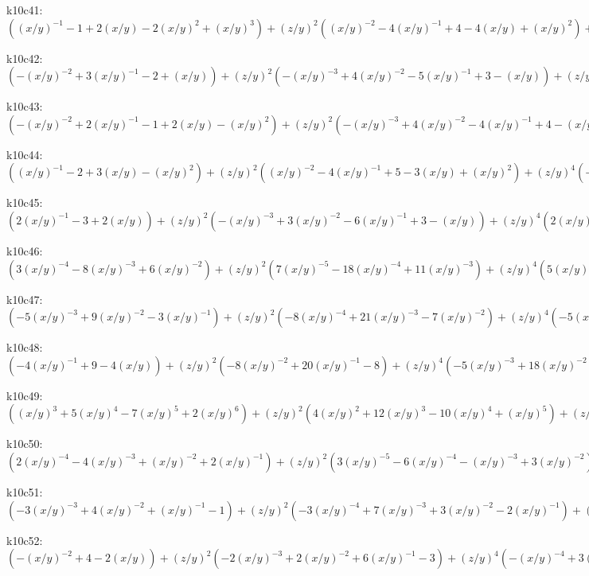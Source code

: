 k10c41: $ ((x/y)^{-1}-1+2(x/y)-2(x/y)^{2}+(x/y)^{3})  +(z/y)^{2}((x/y)^{-2}-4(x/y)^{-1}+4-4(x/y)+(x/y)^{2})  +(z/y)^{4}(-2(x/y)^{-2}+3(x/y)^{-1}-2)  +(x/y)^{-2}(z/y)^{6} $ 

k10c42: $ (-(x/y)^{-2}+3(x/y)^{-1}-2+(x/y))  +(z/y)^{2}(-(x/y)^{-3}+4(x/y)^{-2}-5(x/y)^{-1}+3-(x/y))  +(z/y)^{4}(2(x/y)^{-3}-3(x/y)^{-2}+2(x/y)^{-1})  -(x/y)^{-3}(z/y)^{6} $ 

k10c43: $ (-(x/y)^{-2}+2(x/y)^{-1}-1+2(x/y)-(x/y)^{2})  +(z/y)^{2}(-(x/y)^{-3}+4(x/y)^{-2}-4(x/y)^{-1}+4-(x/y))  +(z/y)^{4}(2(x/y)^{-3}-3(x/y)^{-2}+2(x/y)^{-1})  -(x/y)^{-3}(z/y)^{6} $ 

k10c44: $ ((x/y)^{-1}-2+3(x/y)-(x/y)^{2})  +(z/y)^{2}((x/y)^{-2}-4(x/y)^{-1}+5-3(x/y)+(x/y)^{2})  +(z/y)^{4}(-2(x/y)^{-2}+3(x/y)^{-1}-2)  +(x/y)^{-2}(z/y)^{6} $ 

k10c45: $ (2(x/y)^{-1}-3+2(x/y))  +(z/y)^{2}(-(x/y)^{-3}+3(x/y)^{-2}-6(x/y)^{-1}+3-(x/y))  +(z/y)^{4}(2(x/y)^{-3}-3(x/y)^{-2}+2(x/y)^{-1})  -(x/y)^{-3}(z/y)^{6} $ 

k10c46: $ (3(x/y)^{-4}-8(x/y)^{-3}+6(x/y)^{-2})  +(z/y)^{2}(7(x/y)^{-5}-18(x/y)^{-4}+11(x/y)^{-3})  +(z/y)^{4}(5(x/y)^{-6}-17(x/y)^{-5}+6(x/y)^{-4})  +(z/y)^{6}((x/y)^{-7}-7(x/y)^{-6}+(x/y)^{-5})  -(x/y)^{-7}(z/y)^{8} $ 

k10c47: $ (-5(x/y)^{-3}+9(x/y)^{-2}-3(x/y)^{-1})  +(z/y)^{2}(-8(x/y)^{-4}+21(x/y)^{-3}-7(x/y)^{-2})  +(z/y)^{4}(-5(x/y)^{-5}+18(x/y)^{-4}-5(x/y)^{-3})  +(z/y)^{6}(-(x/y)^{-6}+7(x/y)^{-5}-(x/y)^{-4})  +(x/y)^{-6}(z/y)^{8} $ 

k10c48: $ (-4(x/y)^{-1}+9-4(x/y))  +(z/y)^{2}(-8(x/y)^{-2}+20(x/y)^{-1}-8)  +(z/y)^{4}(-5(x/y)^{-3}+18(x/y)^{-2}-5(x/y)^{-1})  +(z/y)^{6}(-(x/y)^{-4}+7(x/y)^{-3}-(x/y)^{-2})  +(x/y)^{-4}(z/y)^{8} $ 

k10c49: $ ((x/y)^{3}+5(x/y)^{4}-7(x/y)^{5}+2(x/y)^{6})  +(z/y)^{2}(4(x/y)^{2}+12(x/y)^{3}-10(x/y)^{4}+(x/y)^{5})  +(z/y)^{4}(4(x/y)+9(x/y)^{2}-3(x/y)^{3})  +(z/y)^{6}(1+2(x/y)) $ 

k10c50: $ (2(x/y)^{-4}-4(x/y)^{-3}+(x/y)^{-2}+2(x/y)^{-1})  +(z/y)^{2}(3(x/y)^{-5}-6(x/y)^{-4}-(x/y)^{-3}+3(x/y)^{-2})  +(z/y)^{4}((x/y)^{-6}-4(x/y)^{-5}-3(x/y)^{-4}+(x/y)^{-3})  +(z/y)^{6}(-(x/y)^{-6}-(x/y)^{-5}) $ 

k10c51: $ (-3(x/y)^{-3}+4(x/y)^{-2}+(x/y)^{-1}-1)  +(z/y)^{2}(-3(x/y)^{-4}+7(x/y)^{-3}+3(x/y)^{-2}-2(x/y)^{-1})  +(z/y)^{4}(-(x/y)^{-5}+4(x/y)^{-4}+3(x/y)^{-3}-(x/y)^{-2})  +(z/y)^{6}((x/y)^{-5}+(x/y)^{-4}) $ 

k10c52: $ (-(x/y)^{-2}+4-2(x/y))  +(z/y)^{2}(-2(x/y)^{-3}+2(x/y)^{-2}+6(x/y)^{-1}-3)  +(z/y)^{4}(-(x/y)^{-4}+3(x/y)^{-3}+4(x/y)^{-2}-(x/y)^{-1})  +(z/y)^{6}((x/y)^{-4}+(x/y)^{-3}) $ 

